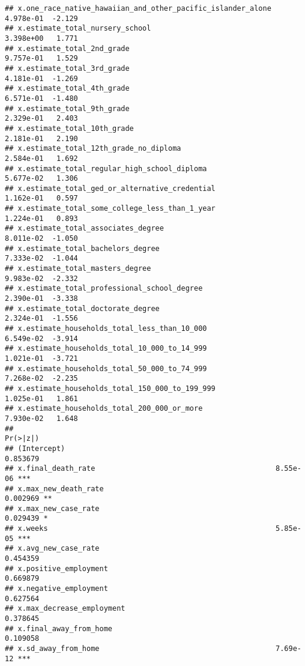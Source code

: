 \documentclass[
]{article}
\begin{document}
\begin{verbatim}
## x.one_race_native_hawaiian_and_other_pacific_islander_alone  4.978e-01  -2.129
## x.estimate_total_nursery_school                              3.398e+00   1.771
## x.estimate_total_2nd_grade                                   9.757e-01   1.529
## x.estimate_total_3rd_grade                                   4.181e-01  -1.269
## x.estimate_total_4th_grade                                   6.571e-01  -1.480
## x.estimate_total_9th_grade                                   2.329e-01   2.403
## x.estimate_total_10th_grade                                  2.181e-01   2.190
## x.estimate_total_12th_grade_no_diploma                       2.584e-01   1.692
## x.estimate_total_regular_high_school_diploma                 5.677e-02   1.306
## x.estimate_total_ged_or_alternative_credential               1.162e-01   0.597
## x.estimate_total_some_college_less_than_1_year               1.224e-01   0.893
## x.estimate_total_associates_degree                           8.011e-02  -1.050
## x.estimate_total_bachelors_degree                            7.333e-02  -1.044
## x.estimate_total_masters_degree                              9.983e-02  -2.332
## x.estimate_total_professional_school_degree                  2.390e-01  -3.338
## x.estimate_total_doctorate_degree                            2.324e-01  -1.556
## x.estimate_households_total_less_than_10_000                 6.549e-02  -3.914
## x.estimate_households_total_10_000_to_14_999                 1.021e-01  -3.721
## x.estimate_households_total_50_000_to_74_999                 7.268e-02  -2.235
## x.estimate_households_total_150_000_to_199_999               1.025e-01   1.861
## x.estimate_households_total_200_000_or_more                  7.930e-02   1.648
##                                                             Pr(>|z|)    
## (Intercept)                                                 0.853679    
## x.final_death_rate                                          8.55e-06 ***
## x.max_new_death_rate                                        0.002969 ** 
## x.max_new_case_rate                                         0.029439 *  
## x.weeks                                                     5.85e-05 ***
## x.avg_new_case_rate                                         0.454359    
## x.positive_employment                                       0.669879    
## x.negative_employment                                       0.627564    
## x.max_decrease_employment                                   0.378645    
## x.final_away_from_home                                      0.109058    
## x.sd_away_from_home                                         7.69e-12 ***

\end{verbatim}
\end{document}
